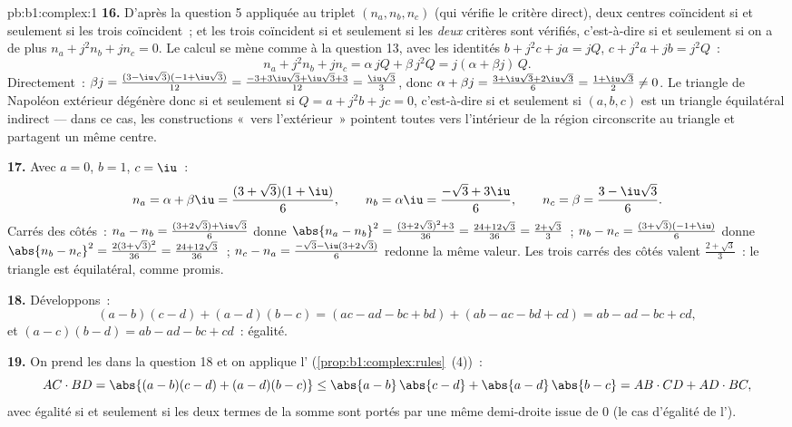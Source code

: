 \begin{solution}{pb:b1:complex:1}
\textbf{16.} D'après la question 5 appliquée au triplet $(n_a, n_b,
n_c)$ (qui vérifie le critère direct), deux centres coïncident si et
seulement si les trois coïncident~; et les trois coïncident si et
seulement si les \emph{deux} critères sont vérifiés, c'est-à-dire si
et seulement si on a de plus $n_a + j^2 n_b + j n_c = 0$. Le calcul
se mène comme à la question 13, avec les identités $b + j^2c + ja =
jQ$, $c + j^2a + jb = j^2Q$~:
\[
n_a + j^2 n_b + j n_c
= \alpha\,jQ + \beta\,j^2 Q = j(\alpha + \beta j)\,Q .
\]
Directement~: $\beta j = \frac{(3 -
\iu\sqrt3)(-1 + \iu\sqrt3)}{12} = \frac{-3 + 3\iu\sqrt3 +
\iu\sqrt3 + 3}{12} = \frac{\iu\sqrt3}3$, donc $\alpha + \beta j =
\frac{3 + \iu\sqrt3 + 2\iu\sqrt3}6 = \frac{1 + \iu\sqrt3}2 \neq
0$. Le triangle de Napoléon extérieur dégénère donc si et seulement
si $Q = a + j^2b + jc = 0$, c'est-à-dire si et seulement si $(a, b,
c)$ est un triangle équilatéral indirect --- dans ce cas, les
constructions «~vers l'extérieur~» pointent toutes vers l'intérieur
de la région circonscrite au triangle et partagent un même centre.

\textbf{17.} Avec $a = 0$, $b = 1$, $c = \iu$~:
\[
n_a = \alpha + \beta\iu = \frac{(3 + \sqrt3)(1 + \iu)}6,
\qquad
n_b = \alpha\iu = \frac{-\sqrt3 + 3\iu}6,
\qquad
n_c = \beta = \frac{3 - \iu\sqrt3}6 .
\]
Carrés des côtés~: $n_a - n_b = \frac{(3 + 2\sqrt3) +
\iu\sqrt3}6$ donne $\abs{n_a - n_b}^2 = \frac{(3 + 2\sqrt3)^2 +
3}{36} = \frac{24 + 12\sqrt3}{36} = \frac{2 + \sqrt3}3$~; $n_b -
n_c = \frac{(3 + \sqrt3)(-1 + \iu)}6$ donne $\abs{n_b - n_c}^2 =
\frac{2(3 + \sqrt3)^2}{36} = \frac{24 + 12\sqrt3}{36}$~; $n_c - n_a
= \frac{-\sqrt3 - \iu(3 + 2\sqrt3)}6$ redonne la même valeur. Les
trois carrés des côtés valent $\frac{2 + \sqrt3}3$~: le triangle est
équilatéral, comme promis.

\textbf{18.} Développons~:
\[
(a - b)(c - d) + (a - d)(b - c)
= (ac - ad - bc + bd) + (ab - ac - bd + cd)
= ab - ad - bc + cd ,
\]
et $(a - c)(b - d) = ab - ad - bc + cd$~: égalité.

\textbf{19.} On prend les  dans la question 18 et on applique
l' (\cref{prop:b1:complex:rules}~(4))~:
\[
AC \cdot BD = \abs{(a-b)(c-d) + (a-d)(b-c)}
\leq \abs{a-b}\,\abs{c-d} + \abs{a-d}\,\abs{b-c}
= AB \cdot CD + AD \cdot BC ,
\]
avec égalité si et seulement si les deux termes de la somme sont
portés par une même demi-droite issue de $0$ (le cas d'égalité de
l').


\end{solution}
